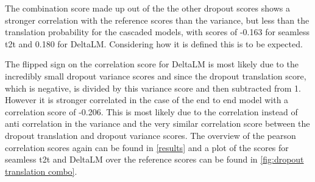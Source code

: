 The combination score made up out of the the other dropout scores shows a stronger correlation with the reference scores than the variance, but less than the translation probability for the cascaded models, with scores of -0.163 for seamless t2t and 0.180 for DeltaLM. Considering how it is defined this is to be expected. 

The flipped sign on the correlation score for DeltaLM is most likely due to the incredibly small dropout variance scores and since the dropout translation score, which is negative, is divided by this variance score and then subtracted from 1.
However it is stronger correlated in the case of the end to end model with a correlation score of -0.206. This is most likely due to the correlation instead of anti correlation in the variance and the very similar correlation score between the dropout translation and dropout variance scores. 
The overview of the pearson correlation scores again can be found in \autoref{results} and a plot of the scores for seamless t2t and DeltaLM over the reference scores can be found in \autoref{fig:dropout translation combo}. 

